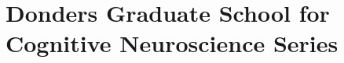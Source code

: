 \clearpage
\pagestyle{empty}

\chapter*{Donders Graduate School for Cognitive Neuroscience Series}
{}%

\npar\npar
\footnotesize
\noindent

\newcommand{\dientry}[8]{%
\noindent #1. #2 (#3). %
\IfSubStr{#8}{/}{%
\href{http://dx.doi.org/#8}{\emph{#4}}
}{%
\emph{#4}
}%
#5, #6, #7\npar%
}
{
\footnotesize
\begin{multicols}{2}

\end{multicols}
}
